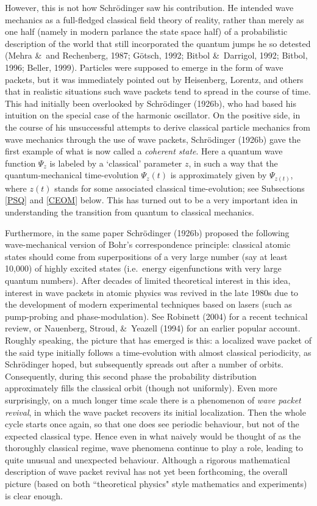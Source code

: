\documentclass[12pt,titlepage]{article}
\begin{document}
However, this is not how Schr\"{o}dinger saw his contribution. He intended wave mechanics as a full-fledged classical field theory of reality, rather than merely as one half (namely in modern parlance the state space half) of a probabilistic description of the world that still incorporated the quantum jumps he so detested (Mehra \&\ and Rechenberg,  1987; G\"{o}tsch, 1992; Bitbol \&\ Darrigol, 1992; Bitbol, 1996;  Beller, 1999). 
Particles were supposed to emerge in the form of wave packets, but it was immediately pointed out by Heisenberg, Lorentz,  and others that in realistic situations such wave packets tend to spread in the course of time. This had initially been overlooked by Schr\"{o}dinger (1926b), who had based his intuition on the special case of the harmonic oscillator. On the positive side, in the course of his unsuccessful attempts to derive classical particle mechanics from wave mechanics through the use of wave packets, Schr\"{o}dinger (1926b) gave the first example of what is now called a {\it coherent state}.
Here a quantum wave function $\Psi_z$ is labeled by a `classical' parameter $z$, in such a way that the quantum-mechanical time-evolution $\Psi_z(t)$ is approximately given by
$\Psi_{z(t)}$, where $z(t)$ stands for some associated classical time-evolution; see Subsections \ref{PSQ} and \ref{CEOM} below. This has turned out to be a very important idea in understanding the transition from quantum to classical mechanics. 

Furthermore, in the same paper Schr\"{o}dinger (1926b) proposed the following wave-mechanical version  of Bohr's correspondence principle: classical atomic states should come from superpositions of a very large number (say at least 10,000) of highly excited states (i.e.\ 
energy eigenfunctions with very large quantum numbers). After decades of limited theoretical interest in this idea, interest in wave packets in atomic physics was revived in the late 1980s  due to the development of modern experimental techniques based on lasers (such as pump-probing and phase-modulation). See  Robinett (2004) for a recent technical review, or  Nauenberg,  Stroud, \&\ Yeazell (1994) for an earlier popular account. Roughly speaking, the picture that has emerged is this: a localized wave packet of the said type initially follows a time-evolution with almost classical periodicity, as Schr\"{o}dinger hoped, but subsequently spreads out after a number of orbits. Consequently, during this second phase the probability distribution  approximately fills the classical orbit (though not uniformly). Even more surprisingly, on a much longer time scale there is a phenomenon of {\it wave packet revival}, in which the wave packet recovers its initial localization. Then the whole cycle starts once again, so that one does see periodic behaviour, but not of the expected classical type. Hence even in what naively would be thought of as the thoroughly  classical regime, wave phenomena continue to play a role,  leading to quite unusual and unexpected behaviour. Although a rigorous mathematical description of wave packet revival has not yet been forthcoming, the overall picture (based on both ``theoretical physics" style mathematics and experiments) is clear enough.
\end{document}
